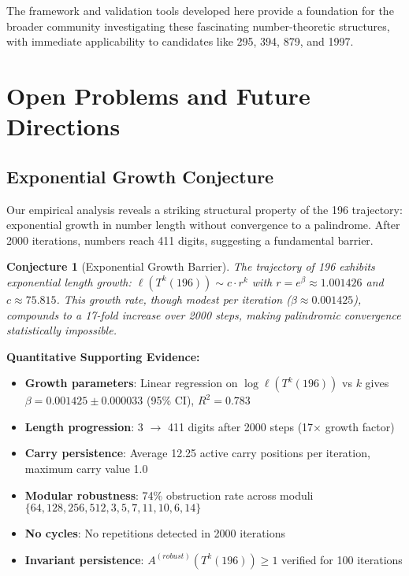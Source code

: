 \documentclass[12pt,a4paper]{article}
\newtheorem{conjecture}[theorem]{Conjecture}
\begin{document}
The framework and validation tools developed here provide a foundation for 
the broader community investigating these fascinating number-theoretic 
structures, with immediate applicability to candidates like 295, 394, 879, 
and 1997.

\section{Open Problems and Future Directions}

\subsection{Exponential Growth Conjecture}

Our empirical analysis reveals a striking structural property of the 196 trajectory: exponential growth in number length without convergence to a palindrome. After 2000 iterations, numbers reach 411 digits, suggesting a fundamental barrier.

\begin{conjecture}[Exponential Growth Barrier]\label{conj:exp_growth}
The trajectory of 196 exhibits exponential length growth: $\ell(T^k(196)) \sim c \cdot r^k$ with $r = e^\beta \approx 1.001426$ and $c \approx 75.815$. This growth rate, though modest per iteration ($\beta \approx 0.001425$), compounds to a 17-fold increase over 2000 steps, making palindromic convergence statistically impossible.
\end{conjecture}

\textbf{Quantitative Supporting Evidence:}
\begin{itemize}
\item \textbf{Growth parameters}: Linear regression on $\log \ell(T^k(196))$ vs $k$ gives $\beta = 0.001425 \pm 0.000033$ (95\% CI), $R^2 = 0.783$
\item \textbf{Length progression}: 3 $\to$ 411 digits after 2000 steps (17$\times$ growth factor)
\item \textbf{Carry persistence}: Average 12.25 active carry positions per iteration, maximum carry value 1.0
\item \textbf{Modular robustness}: 74\% obstruction rate across moduli $\{64, 128, 256, 512, 3, 5, 7, 11, 10, 6, 14\}$
\item \textbf{No cycles}: No repetitions detected in 2000 iterations
\item \textbf{Invariant persistence}: $A^{(robust)}(T^k(196)) \geq 1$ verified for 100 iterations
\end{itemize}
\end{document}
